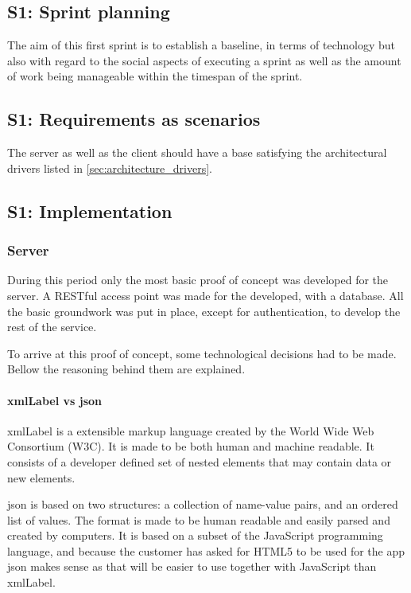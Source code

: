 \documentclass[11pt]{book}
\begin{document}
\subsection{S1: Sprint planning}
The aim of this first sprint is to establish a baseline, in terms of technology but also with regard to the social aspects of executing a sprint as well as the amount of work being manageable within the timespan of the sprint.

\subsection{S1: Requirements as scenarios}
The server as well as the client should have a base satisfying the architectural drivers listed in \ref{sec:architecture_drivers}.

\subsection{S1: Implementation}

\subsubsection{Server}
During this period only the most basic proof of concept was developed for the server. A RESTful access point was made for the developed, with a database. All the basic groundwork was put in place, except for authentication, to develop the rest of the service.

To arrive at this proof of concept, some technological decisions had to be made. Bellow the reasoning behind them are explained.

\paragraph{\gls{xmlLabel} vs \gls{json}}
\gls{xmlLabel} is a extensible markup language created by the World Wide Web Consortium (W3C). It is made to be both human and machine readable. It consists of a developer defined set of nested elements that may contain data or new elements.

\gls{json} \cite{json} is based on two structures: a collection of name-value pairs, and an ordered list of values. The format is made to be human readable and easily parsed and created by computers. It is based on a subset of the JavaScript programming language, and because the customer has asked for HTML5 to be used for the app \gls{json} makes sense as that will be easier to use together with JavaScript than \gls{xmlLabel}.
\end{document}
